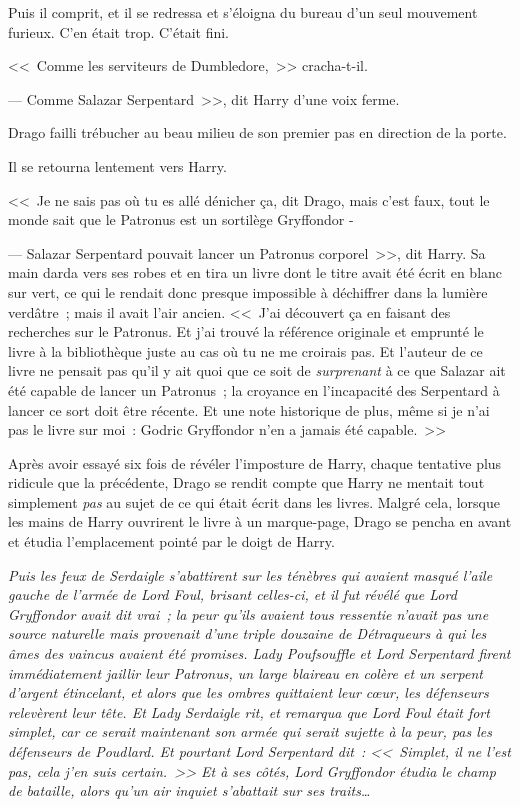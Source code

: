 Puis il comprit, et il se redressa et s'éloigna du bureau d'un seul mouvement furieux. C'en était trop. C'était fini.

<<~Comme les serviteurs de Dumbledore,~>> cracha-t-il.

--- Comme Salazar Serpentard~>>, dit Harry d'une voix ferme.

Drago failli trébucher au beau milieu de son premier pas en direction de la porte.

Il se retourna lentement vers Harry.

<<~Je ne sais pas où tu es allé dénicher ça, dit Drago, mais c'est faux, tout le monde sait que le Patronus est un sortilège Gryffondor -

--- Salazar Serpentard pouvait lancer un Patronus corporel~>>, dit Harry. Sa main darda vers ses robes et en tira un livre dont le titre avait été écrit en blanc sur vert, ce qui le rendait donc presque impossible à déchiffrer dans la lumière verdâtre~; mais il avait l'air ancien. <<~J'ai découvert ça en faisant des recherches sur le Patronus. Et j'ai trouvé la référence originale et emprunté le livre à la bibliothèque juste au cas où tu ne me croirais pas. Et l'auteur de ce livre ne pensait pas qu'il y ait quoi que ce soit de \emph{surprenant} à ce que Salazar ait été capable de lancer un Patronus~; la croyance en l'incapacité des Serpentard à lancer ce sort doit être récente. Et une note historique de plus, même si je n'ai pas le livre sur moi~: Godric Gryffondor n'en a jamais été capable.~>>

Après avoir essayé six fois de révéler l'imposture de Harry, chaque tentative plus ridicule que la précédente, Drago se rendit compte que Harry ne mentait tout simplement \emph{pas} au sujet de ce qui était écrit dans les livres. Malgré cela, lorsque les mains de Harry ouvrirent le livre à un marque-page, Drago se pencha en avant et étudia l'emplacement pointé par le doigt de Harry.

\emph{Puis les feux de Serdaigle s'abattirent sur les ténèbres qui avaient masqué l'aile gauche de l'armée de Lord Foul, brisant celles-ci, et il fut révélé que Lord Gryffondor avait dit vrai~; la peur qu'ils avaient tous ressentie n'avait pas une source naturelle mais provenait d'une triple douzaine de Détraqueurs à qui les âmes des vaincus avaient été promises. Lady Poufsouffle et Lord Serpentard firent immédiatement jaillir leur Patronus, un large blaireau en colère et un serpent d'argent étincelant, et alors que les ombres quittaient leur cœur, les défenseurs relevèrent leur tête. Et Lady Serdaigle rit, et remarqua que Lord Foul était fort simplet, car ce serait maintenant son armée qui serait sujette à la peur, pas les défenseurs de Poudlard. Et pourtant Lord Serpentard dit~: <<~Simplet, il ne l'est pas, cela j'en suis certain.~>> Et à ses côtés, Lord Gryffondor étudia le champ de bataille, alors qu'un air inquiet s'abattait sur ses traits…}

